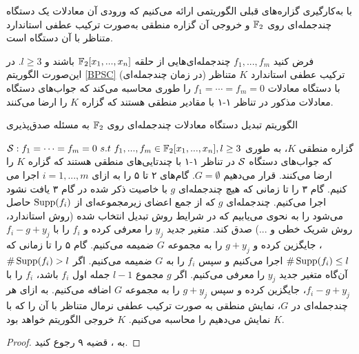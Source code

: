 با به‌کارگیری گزاره‌های قبلی الگوریتمی ارائه می‌کنیم که ورودی آن معادلات یک دستگاه چندجمله‌ای روی 
$\mathbb{F}_{2}$
و خروجی آن گزاره منطقی به‌صورت ترکیب عطفی استاندارد متناظر با آن دستگاه است. 
\begin{proposition}
فرض کنید 
$f_{1},...,f_{m}$
چندجمله‌ای‌هایی از حلقه‌ 
$\mathbb{F}_{2}[x_{1},...,x_{n}]$
باشند و 
$l\geq 3$. 
در این‌صورت الگوریتم 
\ref{BPSC}
(در زمان چندجمله‌ای) ترکیب عطفی استاندارد 
$K$
متناظر با دستگاه معادلات 
$f_{1} = \cdots = f_{m} = 0$
را  طوری محاسبه می‌کند که جواب‌های دستگاه معادلات مذکور در تناظر ۱-۱ با مقادیر منطقی هستند که گزاره 
$K$
را ارضا می‌کنند. 
\renewcommand{\algorithmicrequire}{\textbf{ورودی}}
\renewcommand{\algorithmicensure}{\textbf{خروجی}}
\begin{algorithm}[t]
	\caption{الگوریتم تبدیل دستگاه معادلات چندجمله‌ای روی 
		$\mathbb{F}_{2}$
		به مسئله صدق‌پذیری}
	\label{BPSC}
\begin{algorithmic}[1]		
\REQUIRE 
$\mS: f_{1}=\cdots = f_{m} = 0 \ s.t  \ f_{1},...,f_{m}\in\ffld_{2}[x_{1},...,x_{n}], l\geq 3$
\ENSURE 
گزاره منطقی 
$K$، 
به‌ طوری که جواب‌های دستگاه 
${\mathcal S}$
در تناظر ۱-۱ با چند‌تایی‌های منطقی هستند که گزاره 
$K$
را ارضا می‌کنند. 
\STATE 
قرار می‌دهیم 
$G = \emptyset$.
گام‌های ۲ تا ۵ را به ازای 
$i = 1,...,m$
اجرا می کنیم.
\STATE 
گام‌ ۳ را تا زمانی که هیچ چندجمله‌ای 
$g$
با خاصیت ذکر شده در گام ۳ یافت نشود اجرا می‌کنیم.
\STATE 
چندجمله‌ای 
$g$ 
که از جمع اعضای زیرمجموعه‌ای از 
$\operatorname{\mathrm{Supp}}(f_{i})$
حاصل می‌شود را به نحوی می‌یابیم که در شرایط روش تبدیل انتخاب شده (روش استاندارد، روش شریک خطی و ...) صدق کند.  متغیر جدید 
$y_{j}$
را معرفی کرده و 
$f_{i}$
را با 
$f_{i} - g + y_{j}$، 
جایگزین کرده و 
$g+y_{j}$
را به مجموعه‌ 
$G$
ضمیمه می‌کنیم. 
\STATE 
گام ۵ را تا زمانی که 
$\#\operatorname{\mathrm{Supp}}(f_{i})\leq l$
اجرا می‌کنیم و سپس 
$f_{i}$
را به 
$G$
ضمیمه می‌کنیم. 
\STATE 
اگر 
$\# \operatorname{\mathrm{Supp}}(f_{i}) > l$
آن‌گاه متغیر جدید 
$y_{j}$
را معرفی می‌کنیم. اگر 
$g$
مجموع 
$l-1$
جمله اول 
$f_{i}$
باشد، 
$f_{i}$
را با 
$f_{i} - g + y_{j}$، 
جایگزین کرده و سپس 
$g+y_{j}$
را به مجموعه 
$G$
اضافه می‌کنیم. 
\STATE 
به ازای هر چندجمله‌ای در 
$G$، 
نمایش منطقی به صورت ترکیب عطفی نرمال متناظر با آن را  که با 
$K$
نمایش می‌دهیم را 
محاسبه می‌کنیم. 
$K$
خروجی الگوریتم خواهد بود. 
\end{algorithmic}
\end{algorithm}
\end{proposition}
\begin{proof}
به 
\cite{jovanovic2010algebraic}، 
قضیه ۹ رجوع کنید. 
\end{proof}

